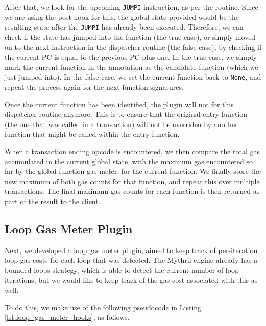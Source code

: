 After that, we look for the upcoming \texttt{JUMPI} instruction, as per the routine.
Since we are using the post hook for this, the global state provided would be the resulting
state after the \texttt{JUMPI} has already been executed. Therefore, we can check if the state has
jumped into the function (the true case), or simply moved on to the next instruction in the 
dispatcher routine (the false case), by checking if the current PC is equal to the previous 
PC plus one. In the true case, we simply mark the current function in the annotation as the 
candidate function (which we just jumped into).
In the false case, we set the current function back to \texttt{None}, and repeat the process
again for the next function signatures.

Once the current function has been identified,
the plugin will not for this dispatcher routine anymore. This is to ensure that the original 
entry function (the one that was called in a transaction) will not be overriden by another 
function that might be called within the entry function.

When a transaction ending opcode is encountered, we then compare the total gas accumulated
in the current global state, with the maximum gas encountered so far by the global function gas meter,
for the current function. We finally store the new maximum of both gas counts for that function,
and repeat this over multiple transactions. The final maximum gas counts for each function is
then returned as part of the result to the client.

\subsection{Loop Gas Meter Plugin}

Next, we developed a loop gas meter plugin, aimed to keep track of per-iteration loop
gas costs for each loop that was detected. The Mythril engine already has a 
bounded loops strategy, which is able to detect the current number of loop iterations, 
but we would like to keep track of the gas cost associated with this as well.

To do this, we make use of the following pseudocode in Listing \ref{lst:loop_gas_meter_hooks},
as follows.

